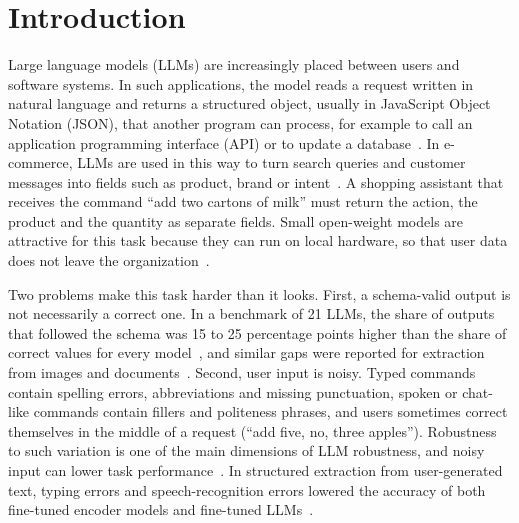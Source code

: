 \documentclass[journal,article,submit,pdftex,moreauthors]{Definitions/mdpi}
\begin{document}

\section{Introduction}\label{sec:intro}

Large language models (LLMs) are increasingly placed between users and software systems. In such applications, the model reads a request written in natural language and returns a structured object, usually in JavaScript Object Notation (JSON), that another program can process, for example to call an application programming interface (API) or to update a database~\citep{shrimal2025parse,feng2026so}. In e-commerce, LLMs are used in this way to turn search queries and customer messages into fields such as product, brand or intent~\citep{zeng2025examples,shrimal2025parse}. A shopping assistant that receives the command ``add two cartons of milk'' must return the action, the product and the quantity as separate fields. Small open-weight models are attractive for this task because they can run on local hardware, so that user data does not leave the organization~\citep{corso2026clinician}.

Two problems make this task harder than it looks. First, a schema-valid output is not necessarily a correct one. In a benchmark of 21 LLMs, the share of outputs that followed the schema was 15 to 25 percentage points higher than the share of correct values for every model~\citep{singh2026structured}, and similar gaps were reported for extraction from images and documents~\citep{feng2026so,ferguson2026extractbench}. Second, user input is noisy. Typed commands contain spelling errors, abbreviations and missing punctuation, spoken or chat-like commands contain fillers and politeness phrases, and users sometimes correct themselves in the middle of a request (``add five, no, three apples''). Robustness to such variation is one of the main dimensions of LLM robustness, and noisy input can lower task performance~\citep{kumar2025robustness}. In structured extraction from user-generated text, typing errors and speech-recognition errors lowered the accuracy of both fine-tuned encoder models and fine-tuned LLMs~\citep{sijan2026beyond}.
\end{document}
